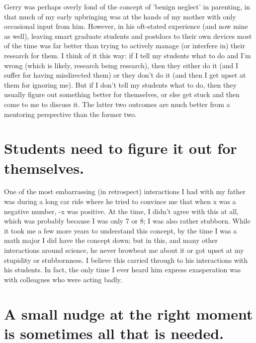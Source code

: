 Gerry was perhaps overly fond of the concept of 'benign neglect' in
parenting, in that much of my early upbringing was at the hands of my
mother with only occasional input from him. However, in his oft-stated
experience (and now mine as well), leaving smart graduate students and
postdocs to their own devices most of the time was far better than
trying to actively manage (or interfere in) their research for them. I
think of it this way: if I tell my students what to do and I'm wrong
(which is likely, research being research), then they either do it
(and I suffer for having misdirected them) or they don't do it (and
then I get upset at them for ignoring me). But if I don't tell my
students what to do, then they usually figure out something better for
themselves, or else get stuck and then come to me to discuss it. The
latter two outcomes are much better from a mentoring perspective than
the former two.

\section*{Students need to figure it out for themselves.}

One of the most embarrassing (in retrospect) interactions I had with
my father was during a long car ride where he tried to convince me
that when x was a negative number, -x was positive. At the time, I
didn't agree with this at all, which was probably because I was only 7
or 8; I was also rather stubborn. While it took me a few more years to
understand this concept, by the time I was a math major I did have the
concept down; but in this, and many other interactions around science,
he never browbeat me about it or got upset at my stupidity or
stubbornness. I believe this carried through to his interactions with
his students. In fact, the only time I ever heard him express
exasperation was with colleagues who were acting badly.

\section*{A small nudge at the right moment is sometimes all that is needed.}

